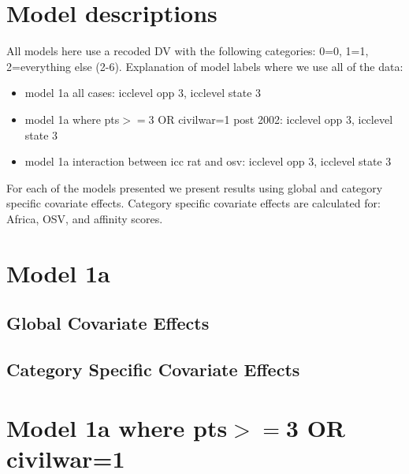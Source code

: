 \documentclass[]{article}
\begin{document}
\tableofcontents

\clearpage

\section*{Model descriptions}

All models here use a recoded DV with the following categories: 0=0, 1=1, 2=everything else (2-6). Explanation of model labels where we use all of the data:

\begin{itemize}
	\item model 1a all cases: icclevel opp 3, icclevel state 3
	\item model 1a where pts$>=$3 OR civilwar=1 post 2002: icclevel opp 3, icclevel state 3
	\item model 1a interaction between icc rat and osv: icclevel opp 3, icclevel state 3
\end{itemize}

For each of the models presented we present results using global and category specific covariate effects. Category specific covariate effects are calculated for: Africa, OSV, and affinity scores.
\clearpage

\section{Model 1a}
\subsection{Global Covariate Effects}

\clearpage
\subsection{Category Specific Covariate Effects}

\clearpage

\section{Model 1a where pts$>=$3 OR civilwar=1}
\end{document}
